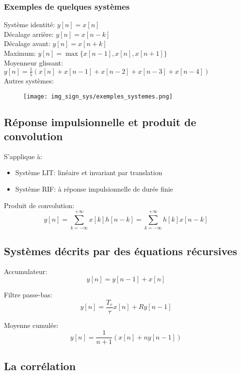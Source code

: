 \documentclass[10pt, twocolumn]{article}
\begin{document}
			\subsubsection*{Exemples de quelques systèmes}
				Système identité: $y[n]=x[n]$ \\
				Décalage arrière: $y[n]=x[n-k]$ \\
				Décalage avant: $y[n]=x[n+k]$ \\
				Maximum: $y[n]=\max \{x[n-1], x[n], x[n+1]\}$ \\
				Moyenneur glissant: $y[n]=\frac{1}{5}(x[n]+x[n-1]+x[n-2]+x[n-3]+x[n-4])$ \\
				
				Autres systèmes:
				
				\begin{figure}[h!]
					\texttt{[image: img\_sign\_sys/exemples\_systemes.png]}
					\centering
				\end{figure}
				
			
		\subsection*{Réponse impulsionnelle et produit de convolution}
			
			S'applique à:
			\begin{itemize}
				\item Système LIT: linéaire et invariant par translation
				\item Système RIF: à réponse impulsionnelle de durée finie
			\end{itemize}
			
			Produit de convolution:
			\[y[n]=\sum_{k=-\infty}^{+\infty} x[k] h[n-k]=\sum_{k=-\infty}^{+\infty} h[k] x[n-k]\]
			
		\subsection*{Systèmes décrits par des équations récursives}
			
			Accumulateur:
			\[y[n]=y[n-1]+x[n]\]
			
			Filtre passe-bas:
			\[y[n]=\frac{T_{e}}{\tau} x[n]+R y[n-1]\]
			
			Moyenne cumulée:
			\[y[n]=\frac{1}{n+1}(x[n]+n y[n-1])\]
			
		\subsection*{La corrélation}
			
\end{document}
